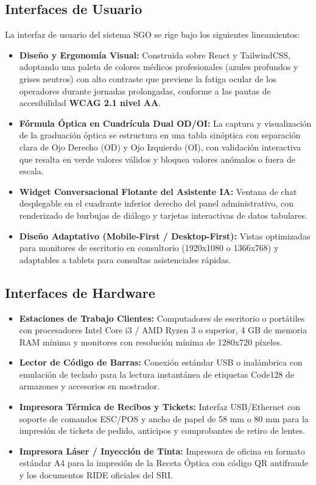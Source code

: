 \documentclass[12pt,a4paper]{report}
\begin{document}
\subsection{Interfaces de Usuario}
La interfaz de usuario del sistema SGO se rige bajo los siguientes lineamientos:
\begin{itemize}
    \item \textbf{Diseño y Ergonomía Visual:} Construida sobre React y TailwindCSS, adoptando una paleta de colores médicos profesionales (azules profundos y grises neutros) con alto contraste que previene la fatiga ocular de los operadores durante jornadas prolongadas, conforme a las pautas de accesibilidad \textbf{WCAG 2.1 nivel AA}.
    \item \textbf{Fórmula Óptica en Cuadrícula Dual OD/OI:} La captura y visualización de la graduación óptica se estructura en una tabla sinóptica con separación clara de Ojo Derecho (OD) y Ojo Izquierdo (OI), con validación interactiva que resalta en verde valores válidos y bloquea valores anómalos o fuera de escala.
    \item \textbf{Widget Conversacional Flotante del Asistente IA:} Ventana de chat desplegable en el cuadrante inferior derecho del panel administrativo, con renderizado de burbujas de diálogo y tarjetas interactivas de datos tabulares.
    \item \textbf{Diseño Adaptativo (Mobile-First / Desktop-First):} Vistas optimizadas para monitores de escritorio en consultorio (1920x1080 o 1366x768) y adaptables a tablets para consultas asistenciales rápidas.
\end{itemize}

\subsection{Interfaces de Hardware}
\begin{itemize}
    \item \textbf{Estaciones de Trabajo Clientes:} Computadores de escritorio o portátiles con procesadores Intel Core i3 / AMD Ryzen 3 o superior, 4 GB de memoria RAM mínima y monitores con resolución mínima de 1280x720 píxeles.
    \item \textbf{Lector de Código de Barras:} Conexión estándar USB o inalámbrica con emulación de teclado para la lectura instantánea de etiquetas Code128 de armazones y accesorios en mostrador.
    \item \textbf{Impresora Térmica de Recibos y Tickets:} Interfaz USB/Ethernet con soporte de comandos ESC/POS y ancho de papel de 58 mm o 80 mm para la impresión de tickets de pedido, anticipos y comprobantes de retiro de lentes.
    \item \textbf{Impresora Láser / Inyección de Tinta:} Impresora de oficina en formato estándar A4 para la impresión de la Receta Óptica con código QR antifraude y los documentos RIDE oficiales del SRI.
\end{itemize}
\end{document}
